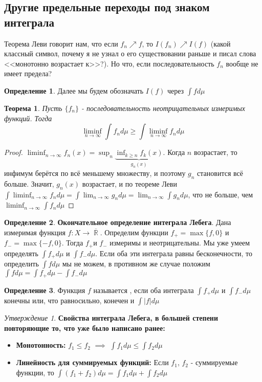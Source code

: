 \documentclass[a4paper]{article}
\theoremstyle{indented}
\newtheorem{theorem}{Теорема}
\theoremstyle{definition}
\newtheorem{defn}{Определение}
\theoremstyle{remark}
\newtheorem{stat}{Утверждение}
\DeclareMathOperator{\ra}{\rightarrow}
\DeclareMathOperator{\RR}{\mathbb{R}}
\begin{document}
\subsection{Другие предельные переходы под знаком интеграла}
Теорема Леви говорит нам, что если $f_n \nearrow f$, то $I(f_n) \nearrow I(f)$ (какой классный символ, почему я не узнал о его существовании раньше и писал слова <<монотонно возрастает к>>?). Но что, если последовательность $f_n$ вообще не имеет предела?
\begin{defn}
Далее мы будем обозначать $I(f) $ через $\int f d\mu$
\end{defn}
\begin{theorem}
 Пусть $\{f_n\}$ - последовательность неотрицательных измеримых функций. Тогда $$\liminf_{n \ra \infty} \int f_n d \mu \geq \int \liminf_{n \ra \infty} f_n d \mu$$
\end{theorem}
\begin{proof}
$\liminf_{n \ra \infty} f_n(x) = \sup_{n}\underbrace{ \inf_{k \geq  n} f_k(x)}_{g_n(x)} $. Когда $n$ возрастает, то инфимум берётся по всё меньшему множеству, и поэтому $g_n$ становится всё больше. Значит, $g_n(x)$ возрастает, и по теореме Леви $\int \liminf_{n \ra \infty} f_n d\mu =\int \lim_{n \ra \infty} g_n d\mu = \lim_{n \ra \infty} \int g_n d \mu$, что не больше, чем $\liminf_{n \ra \infty} \int f_n d \mu$
\end{proof}
\begin{defn}
\textbf{Окончательное определение интеграла Лебега}. Дана измеримая функция $f: X \ra \overline{\RR}$. Определим функции $f_+=\max\{f, 0\}$ и $f_- = \max\{-f, 0\}$. Тогда $f_+$и $f_-$ измеримы и неотрицательны. Мы уже умеем определять $\int f_+ d \mu$ и $\int f_- d \mu$. Если оба эти интеграла равны бесконечности, то определить $\int f d \mu$ мы не можем, в противном же случае положим $\int f d \mu = \int f_+ d \mu - \int f_- d \mu$ 
\end{defn}
\begin{defn}
Функция $f$ называется , если оба интеграла $\int f_+ d \mu$ и $\int f_- d \mu$ конечны или, что равносильно, конечен и $\int |f| d \mu$
\end{defn}
\begin{stat}
\textbf{Свойства интеграла Лебега, в большей степени повторяющие то, что уже было написано ранее:} 
\begin{itemize}
    \item\textbf{ Монотонность: } $f_1 \leq f_2$ $\implies $ $\int f_1 d \mu \leq \int f_2 d \mu$
    \item \textbf{Линейность для суммируемых функций:} Если $f_1$, $f_2$ - суммируемые функции, то $\int (f_1+f_2) d \mu = \int f_1 d \mu + \int f_2 d \mu$
\end{itemize}
\end{stat}
\end{document}
